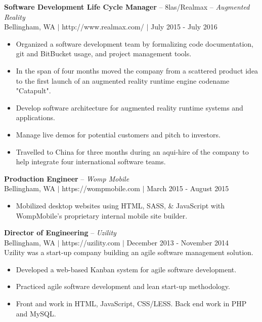 \documentclass[line,margin]{res}
\begin{document}
\begin{resume}
    {\bf Software Development Life Cycle Manager} -- 8las/Realmax -- {\sl Augmented Reality } \\
    {\footnotesize Bellingham, WA $|$ http://www.realmax.com/ $|$ July 2015 - July 2016}
    \begin{itemize} \itemsep -1pt
        \item Organized a software development team by formalizing code documentation,
            git and BitBucket usage, and project management tools.
        \item In the span of four months moved the company from a scattered product idea to the first launch of an augmented reality runtime engine codename "Catapult".
        \item Develop software architecture for augmented reality runtime systems and applications.
        \item Manage live demos for potential customers and pitch to investors.
        \item Travelled to China for three months during an aqui-hire of the company to help integrate four international software teams.
    \end{itemize}

    {\bf Production Engineer} -- {\sl Womp Mobile} \\
    {\footnotesize Bellingham, WA $|$ https://wompmobile.com $|$ March 2015 - August 2015}
    \begin{itemize} \itemsep -1pt
        \item Mobilized desktop websites using HTML, SASS, \& JavaScript with WompMobile's proprietary internal mobile site builder.
    \end{itemize}

    {\bf Director of Engineering} -- {\sl Uzility} \\
    {\footnotesize Bellingham, WA $|$ https://uzility.com $|$ December 2013 - November 2014} \\
    Uzility was a start-up company building an agile software management solution.
    \begin{itemize}  \itemsep -1pt
        \item Developed a web-based Kanban system for agile software development.
        \item Practiced agile software development and lean start-up methodology.
        \item Front and work in HTML, JavaScript, CSS/LESS. Back end work in PHP and MySQL.
    \end{itemize}


\end{resume}
\end{document}
